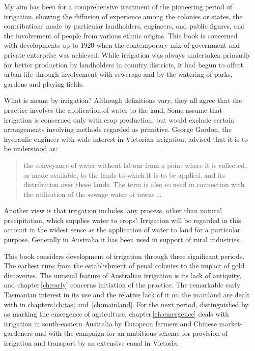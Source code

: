 My aim has been for a comprehensive treatment of the pioneering period
of irrigation, showing the diffusion of experience among the colonies
or states, the contributions made by particular landholders,
engineers, and public figures, and the involvement of people from
various ethnic origins.  This book is concerned with developments up
to 1920 when the contemporary mix of government and private enterprise
was achieved.  While irrigation was always undertaken primarily for
better production by landholders in country districts, it had begun to
affect urban life through involvement with sewerage and by the
watering of parks, gardens and playing fields.

What is meant by irrigation?  Although definitions vary, they all
agree that the practice involves the application of water to the land.
Some assume that irrigation is concerned only with crop production,
but would exclude certain arrangements involving methods regarded as
primitive.  George Gordon, the hydraulic engineer with wide interest
in Victorian irrigation, advised that it is to be understood as:
\begin{quote}
	the conveyance of water without labour from a point where it
	is collected, or made available, to the lands to which it is
	to be applied, and its distribution over these lands. The term
	is also so used in connection with the utilisation of the
	sewage water of towns \ldots{}
\end{quote}
Another view is that irrigation includes `any process, other than
natural precipitation, which supplies water to crops'.  Irrigation
will be regarded in this account in the widest sense as the
application of water to land for a particular purpose.  Generally in
Australia it has been used in support of rural
industries.

This book considers development of irrigation through three
significant periods.  The earliest runs from the establishment of
penal colonies to the impact of gold discoveries.  The unusual feature
of Australian irrigation is its lack of antiquity, and
chapter\,\ref{ch:early} concerns initiation of the practice.  The
remarkable early Tasmanian interest in its use and the relative lack
of it on the mainland are dealt with in chapters\,\ref{ch:tas}
and~\ref{ch:mainland}.  For the next period, distinguished by
\citet{roberts1924} as marking the emergence of
agriculture, chapter\,\ref{ch:emergence} deals with irrigation in
south-eastern Australia by European farmers and Chinese
market-gardeners and with the campaign for an ambitious scheme for
provision of irrigation and transport by an extensive canal in
Victoria.

